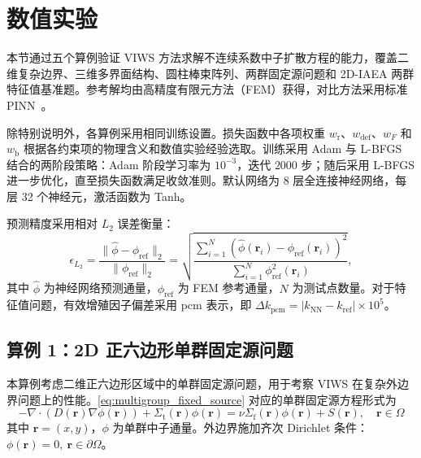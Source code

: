 \documentclass[final,3p,times,sort&compress]{elsarticle}
\begin{document}
\section{数值实验}
\label{sec:numerical_experiments}

本节通过五个算例验证 VIWS 方法求解不连续系数中子扩散方程的能力，覆盖二维复杂边界、三维多界面结构、圆柱棒束阵列、两群固定源问题和 2D-IAEA 两群特征值基准题。参考解均由高精度有限元方法（FEM）获得，对比方法采用标准 PINN~\cite{raissi2019physicsinformed}。

除特别说明外，各算例采用相同训练设置。损失函数中各项权重 $w_{\mathrm r}$、$w_{\mathrm{def}}$、$w_F$ 和 $w_{\mathrm b}$ 根据各约束项的物理含义和数值实验经验选取。训练采用 Adam 与 L-BFGS 结合的两阶段策略：Adam 阶段学习率为 $10^{-3}$，迭代 $2000$ 步；随后采用 L-BFGS 进一步优化，直至损失函数满足收敛准则。默认网络为 8 层全连接神经网络，每层 32 个神经元，激活函数为 Tanh。


预测精度采用相对 $L_2$ 误差衡量：
\begin{equation}
    \label{eq:l2_error}
    \epsilon_{L_2}
    =
    \frac{\|\hat{\phi}-\phi_{\mathrm{ref}}\|_2}{\|\phi_{\mathrm{ref}}\|_2}
    =
    \sqrt{
        \frac{
            \sum_{i=1}^{N}
            \left(
            \hat{\phi}(\boldsymbol r_i)-\phi_{\mathrm{ref}}(\boldsymbol r_i)
            \right)^2
        }{
            \sum_{i=1}^{N}
            \phi_{\mathrm{ref}}^2(\boldsymbol r_i)
        }},
\end{equation}
其中 $\hat{\phi}$ 为神经网络预测通量，$\phi_{\mathrm{ref}}$ 为 FEM 参考通量，$N$ 为测试点数量。对于特征值问题，有效增殖因子偏差采用 pcm 表示，即
$\Delta k_{\mathrm{pcm}}=|k_{\mathrm{NN}}-k_{\mathrm{ref}}|\times 10^5$。
\subsection{算例 1：2D 正六边形单群固定源问题}
\label{subsec:case1}

本算例考虑二维正六边形区域中的单群固定源问题，用于考察 VIWS 在复杂外边界问题上的性能。\cref{eq:multigroup_fixed_source} 对应的单群固定源方程形式为
{\color{black}
\begin{equation}
-\nabla\cdot \left( D(\boldsymbol r)\nabla\phi(\boldsymbol r) \right) + \Sigma_{\mathrm{t}}(\boldsymbol r)\phi(\boldsymbol r) = \nu\Sigma_{\mathrm{f}}(\boldsymbol r)\phi(\boldsymbol r) + S(\boldsymbol r), \quad \boldsymbol r\in\Omega
\label{eq:single_group_diffusion}
\end{equation}}
其中 $\boldsymbol r=(x,y)$，$\phi$ 为单群中子通量。外边界施加齐次 Dirichlet 条件：
$\phi(\boldsymbol r)=0,\ \boldsymbol r\in\partial\Omega$。
\end{document}
